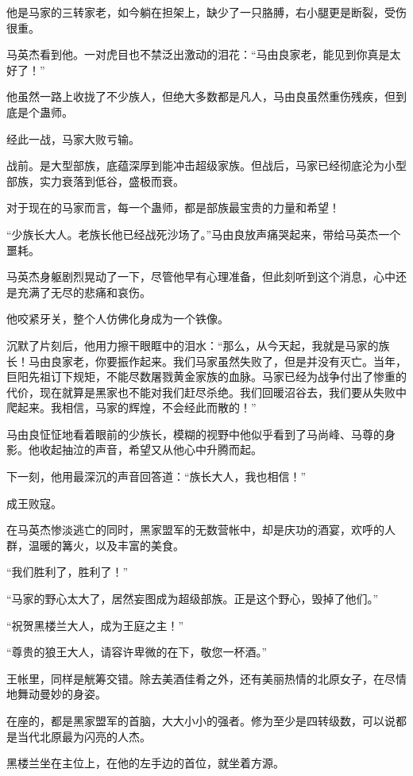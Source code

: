 \begin{this_body}
他是马家的三转家老，如今躺在担架上，缺少了一只胳膊，右小腿更是断裂，受伤很重。

马英杰看到他。一对虎目也不禁泛出激动的泪花：“马由良家老，能见到你真是太好了！”

他虽然一路上收拢了不少族人，但绝大多数都是凡人，马由良虽然重伤残疾，但到底是个蛊师。

经此一战，马家大败亏输。

战前。是大型部族，底蕴深厚到能冲击超级家族。但战后，马家已经彻底沦为小型部族，实力衰落到低谷，盛极而衰。

对于现在的马家而言，每一个蛊师，都是部族最宝贵的力量和希望！

“少族长大人。老族长他已经战死沙场了。”马由良放声痛哭起来，带给马英杰一个噩耗。

马英杰身躯剧烈晃动了一下，尽管他早有心理准备，但此刻听到这个消息，心中还是充满了无尽的悲痛和哀伤。

他咬紧牙关，整个人仿佛化身成为一个铁像。

沉默了片刻后，他用力擦干眼眶中的泪水：“那么，从今天起，我就是马家的族长！马由良家老，你要振作起来。我们马家虽然失败了，但是并没有灭亡。当年，巨阳先祖订下规矩，不能尽数屠戮黄金家族的血脉。马家已经为战争付出了惨重的代价，现在就算是黑家也不能对我们赶尽杀绝。我们回暖沼谷去，我们要从失败中爬起来。我相信，马家的辉煌，不会经此而散的！”

马由良怔怔地看着眼前的少族长，模糊的视野中他似乎看到了马尚峰、马尊的身影。他收起抽泣的声音，希望又从他心中升腾而起。

下一刻，他用最深沉的声音回答道：“族长大人，我也相信！”

成王败寇。

在马英杰惨淡逃亡的同时，黑家盟军的无数营帐中，却是庆功的酒宴，欢呼的人群，温暖的篝火，以及丰富的美食。

“我们胜利了，胜利了！”

“马家的野心太大了，居然妄图成为超级部族。正是这个野心，毁掉了他们。”

“祝贺黑楼兰大人，成为王庭之主！”

“尊贵的狼王大人，请容许卑微的在下，敬您一杯酒。”

王帐里，同样是觥筹交错。除去美酒佳肴之外，还有美丽热情的北原女子，在尽情地舞动曼妙的身姿。

在座的，都是黑家盟军的首脑，大大小小的强者。修为至少是四转级数，可以说都是当代北原最为闪亮的人杰。

黑楼兰坐在主位上，在他的左手边的首位，就坐着方源。


\end{this_body}
